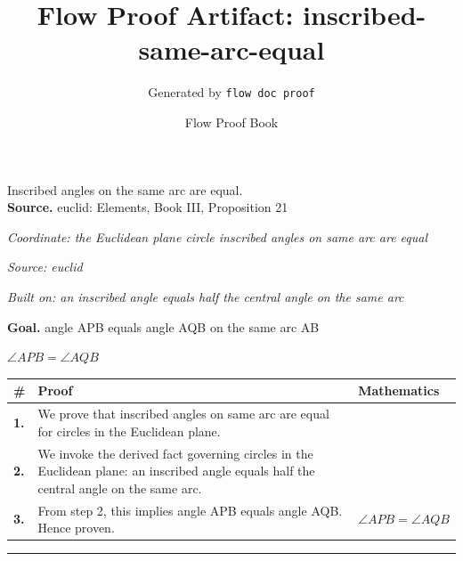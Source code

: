 \documentclass[11pt]{article}
\title{Flow Proof Artifact: inscribed-same-arc-equal}
\author{Generated by \texttt{flow doc proof}}
\date{Flow Proof Book}
\theoremstyle{definition}
\begin{document}
\maketitle
Inscribed angles on the same arc are equal.\\[0.5em]
\textbf{Source.} euclid: Elements, Book III, Proposition 21\\[0.5em]
\bigskip
{}\par
\smallskip\noindent\textit{Coordinate: the Euclidean plane \cdot circle \cdot inscribed angles on same arc are equal}\par
\smallskip\noindent\textit{Source: euclid}\par
\smallskip\noindent\textit{Built on: an inscribed angle equals half the central angle on the same arc}\par
\medskip
\noindent\textbf{Goal.} angle APB equals angle AQB on the same arc AB\par
\noindent$\displaystyle \angle APB = \angle AQB$\par
\medskip
\noindent
\begin{tabular}{@{} >{\raggedright\arraybackslash}p{} >{\raggedright\arraybackslash}p{} >{\raggedleft\arraybackslash}p{} @{}}
\textbf{\#} & \textbf{Proof} & \textbf{Mathematics} \\
\midrule
\textbf{1.} & We prove that inscribed angles on same arc are equal for circles in the Euclidean plane. & \\[0.45em]
\textbf{2.} & We invoke the derived fact governing circles in the Euclidean plane: an inscribed angle equals half the central angle on the same arc. & \\[0.45em]
\textbf{3.} & From step 2, this implies angle APB equals angle AQB. Hence proven. & $\displaystyle \angle APB = \angle AQB$ \\[0.45em]
\bottomrule
\end{tabular}
\label{thm:Geometry-circle-inscribed_angles_on_same_arc_are_equal}
\par\medskip\hrule
\end{document}
